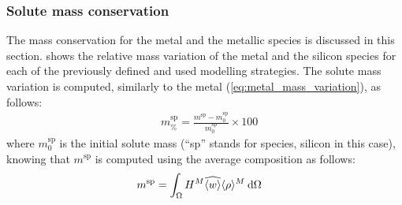\subsubsection{Solute mass conservation}

The mass conservation for the metal and the metallic species is discussed in this section.
 shows the relative mass variation of the metal and the silicon species
for each of the previously defined and used modelling strategies.
The solute mass variation is computed, similarly to the metal (\cref{eq:metal_mass_variation}), as follows:
\begin{align}
\label{eq:solute_mass_variation}
&  m^\text{sp}_\% = \frac{m^\text{sp} - m^\text{sp}_0}{m^\text{sp}_0} \times 100	
\end{align}
where $m^\text{sp}_0$ is the initial solute mass (``sp'' stands for species, silicon in this case), knowing that
$m^\text{sp}$ is computed using the average composition as follows:
\begin{align}
\label{eq:solute_mass_initial}
&  m^\text{sp} = \int_{\Omega} H^M \widehat{\langle w \rangle} \langle \rho \rangle^M \: \mathrm{d}\Omega
\end{align}

